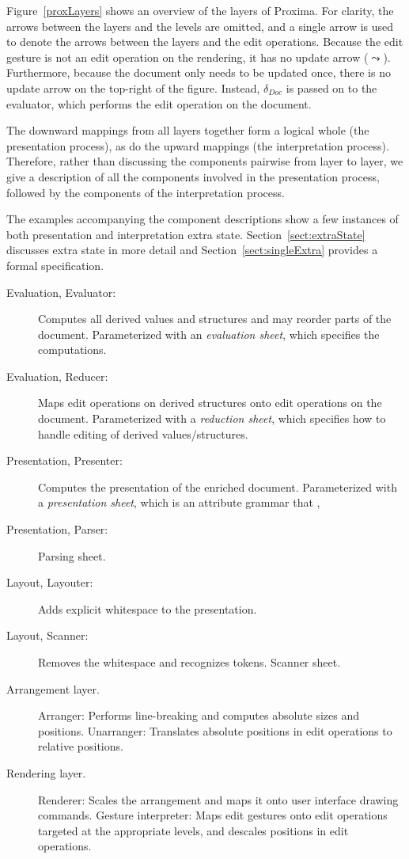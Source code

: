 Figure~\ref{proxLayers} shows an overview of the layers of Proxima. For clarity, the arrows between the layers and the levels are omitted, and a single arrow is used to denote the arrows between the layers and the edit operations. Because the edit gesture is not an edit operation on the rendering, it has no update arrow ($\leadsto$). Furthermore, because the document only needs to be updated once, there is no update arrow on the top-right of the figure. Instead, $\delta_{Doc}$ is passed on to the evaluator, which performs the edit operation on the document.

The downward mappings from all layers together form a logical whole (the presentation process), as do the upward mappings (the interpretation process). Therefore, rather than discussing the components pairwise from layer to layer, we give a description of all the components involved in the presentation process, followed by the components of the interpretation process. 

The examples accompanying the component descriptions show a few instances of both presentation and interpretation extra state. Section~\ref{sect:extraState} discusses extra state in more detail and Section~\ref{sect:singleExtra} provides a formal specification. 

\bc
\begin{description}
\item [Evaluation, Evaluator:] Computes all derived values and structures and may reorder parts of the document. Parameterized with an {\em evaluation sheet}, which specifies the computations.
\item [Evaluation, Reducer:] Maps edit operations on derived structures onto edit operations on the document. Parameterized with a {\em reduction sheet}, which specifies how to handle editing of derived values/structures.
\item [Presentation, Presenter:] Computes the presentation of the enriched document. Parameterized with a {\em presentation sheet}, which is an attribute grammar that , 
\item [Presentation, Parser:] Parsing sheet.
\item [Layout, Layouter:] Adds explicit whitespace to the presentation.
\item [Layout, Scanner:] Removes the whitespace and recognizes tokens. Scanner sheet.
\item [Arrangement layer.]
Arranger: Performs line-breaking and computes absolute sizes and positions.
Unarranger: Translates absolute positions in edit operations to relative positions.
\item [Rendering layer.]
Renderer: Scales the arrangement and maps it onto user interface drawing commands.
Gesture interpreter: Maps edit gestures onto edit operations targeted at the appropriate levels, and descales positions in edit operations.
\end{description}
\ec


